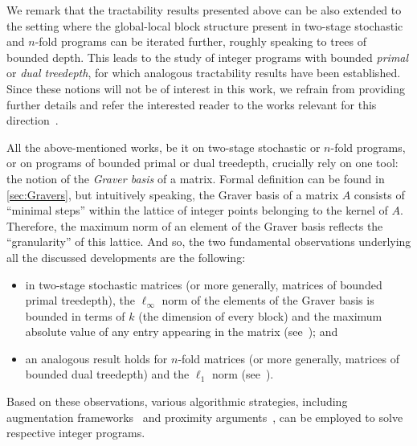 \documentclass{article}
\begin{document}
We remark that the tractability results presented above can be also extended to the setting where the global-local block structure present in two-stage stochastic and $n$-fold programs can be iterated further, roughly speaking to trees of bounded depth. This leads to the study of integer programs with bounded {\em{primal}} or {\em{dual treedepth}}, for which analogous tractability results have been established. Since these notions will not be of interest in this work, we refrain from providing further details and refer the interested reader to the works relevant for this direction~\cite{BrianskiKKPS22,ChanCKKP22,ChenM18,CslovjecsekEHRW21,CslovjecsekEPVW21,EisenbrandHK18,monster,DBLP:journals/mp/Klein22,KleinR22,KnopPW20,KouteckyLO18}.

All the above-mentioned works, be it on two-stage stochastic or $n$-fold programs, or on programs of bounded primal or dual treedepth, crucially rely on one tool: the notion of the {\em{Graver basis}} of a matrix. Formal definition can be found in \cref{sec:Gravers}, but intuitively speaking, the Graver basis of a matrix $A$ consists of ``minimal steps'' within the lattice of integer points belonging to the kernel of $A$. Therefore, the maximum norm of an element of the Graver basis reflects the ``granularity'' of this lattice. And so, the two fundamental observations underlying all the discussed developments are the following:
\begin{itemize}[nosep]
    \item in two-stage stochastic matrices (or more generally, matrices of bounded primal treedepth), the $\ell_\infty$ norm of the elements of the Graver basis is bounded in terms of $k$ (the dimension of every block) and the maximum absolute value of any entry appearing in the matrix (see~\cite[Lemma~28]{monster}); and
    \item an analogous result holds for $n$-fold matrices (or more generally, matrices of bounded dual treedepth) and the $\ell_1$ norm (see~\cite[Lemma~30]{monster}).
\end{itemize}
Based on these observations, various algorithmic strategies, including augmentation frameworks~\cite{JansenLR20,KouteckyLO18} and proximity arguments~\cite{CslovjecsekEHRW21,CslovjecsekEPVW21,EisenbrandHK18}, can be employed to solve respective integer programs.
\end{document}
